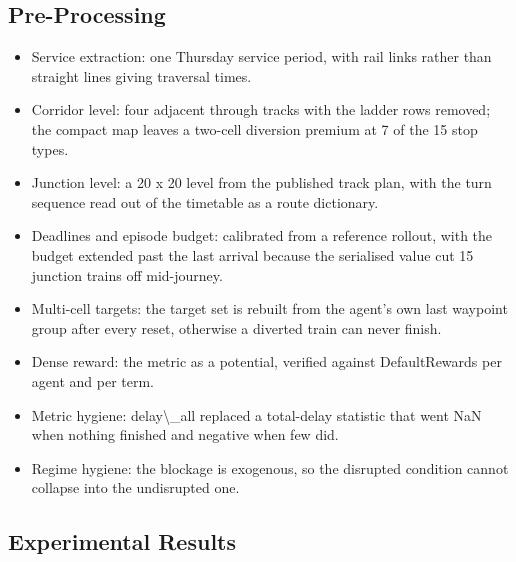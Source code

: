 \documentclass[11pt,a4paper]{article}
\begin{document}
\subsection{Pre-Processing}

\begin{itemize}[leftmargin=*,itemsep=2pt]
\item Service extraction: one Thursday service period, with rail links rather than straight lines giving traversal times.
\item Corridor level: four adjacent through tracks with the ladder rows removed; the compact map leaves a two-cell diversion premium at 7 of the 15 stop types.
\item Junction level: a 20 x 20 level from the published track plan, with the turn sequence read out of the timetable as a route dictionary.
\item Deadlines and episode budget: calibrated from a reference rollout, with the budget extended past the last arrival because the serialised value cut 15 junction trains off mid-journey.
\item Multi-cell targets: the target set is rebuilt from the agent's own last waypoint group after every reset, otherwise a diverted train can never finish.
\item Dense reward: the metric as a potential, verified against DefaultRewards per agent and per term.
\item Metric hygiene: delay\textbackslash{}\_all replaced a total-delay statistic that went NaN when nothing finished and negative when few did.
\item Regime hygiene: the blockage is exogenous, so the disrupted condition cannot collapse into the undisrupted one.
\end{itemize}
\subsection{Experimental Results}
\end{document}
